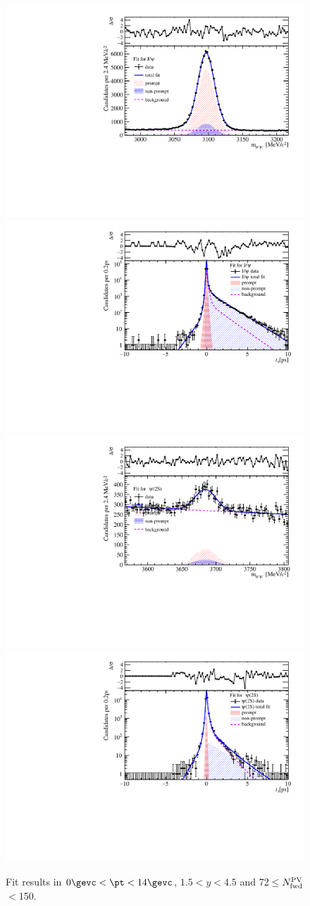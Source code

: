\begin{figure}[H]
\begin{center}
\includegraphics[width=0.45\linewidth]{pdf/pPb/FWorkdir/TwoDimFit/ProjMass/Jpsi_n5y1pt1.pdf}
\includegraphics[width=0.45\linewidth]{pdf/pPb/FWorkdir/TwoDimFit/ProjTz/Jpsi_n5y1pt1.pdf}
\vspace*{-0.5cm}
\includegraphics[width=0.45\linewidth]{pdf/pPb/FWorkdir/TwoDimFit/ProjMass/Psi2S_n5y1pt1.pdf}
\includegraphics[width=0.45\linewidth]{pdf/pPb/FWorkdir/TwoDimFit/ProjTz/Psi2S_n5y1pt1.pdf}
\vspace*{-0.5cm}
\end{center}
\caption{Fit results in $0\gevc<\pt<14\gevc$, $1.5<y<4.5$ and 72$\leq$$N^{\rm PV}_{\rm fwd}$$<$150.}
\end{figure}



